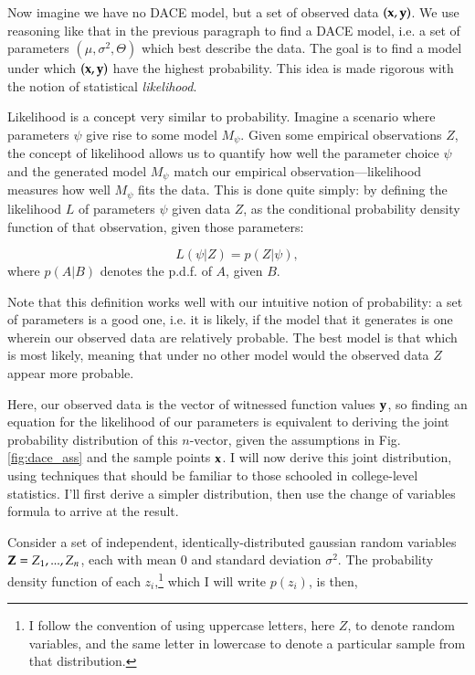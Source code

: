 Now imagine we have no DACE model, but a set of observed data $(\mathbf{x},\mathbf{y})$. We use reasoning like that in the previous paragraph to find a DACE model, i.e. a set of parameters $(\mu,\sigma^2,\Theta)$ which best describe the data. The goal is to find a model under which $(\mathbf{x},\mathbf{y})$ have the highest probability. This idea is made rigorous with the notion of statistical \emph{likelihood}.

Likelihood is a concept very similar to probability. %
Imagine a scenario where parameters $\psi$ give rise to some model $M_\psi$. Given some empirical observations $Z$, the concept of likelihood allows us to quantify how well the parameter choice $\psi$ and the generated model $M_\psi$ match our empirical observation---likelihood measures how well $M_\psi$ fits the data. This is done quite simply: by defining the likelihood $L$ of parameters $\psi$ given data $Z$, as the conditional probability density function of that observation, given those parameters:

\begin{equation} \label{eq:def_likelihood}
L(\psi|Z) = p(Z|\psi),
\end{equation}
where $p(A|B)$ denotes the p.d.f. of $A$, given $B$.

Note that this definition works well with our intuitive notion of probability: a set of parameters is a good one, i.e. it is likely, if the model that it generates is one wherein our observed data are relatively probable. The best model is that which is most likely, meaning that under no other model would the observed data $Z$ appear more probable.

Here, our observed data is the vector of witnessed function values $\mathbf{y}$, so finding an equation for the likelihood of our parameters is equivalent to deriving the joint probability distribution of this $n$-vector, given the assumptions in Fig. \ref{fig:dace_ass} and the sample points $\mathbf{x}$. I will now derive this joint distribution, using techniques that should be familiar to those schooled in college-level statistics. I'll first derive a simpler distribution, then use the change of variables formula to arrive at the result.

Consider a set of independent, identically-distributed gaussian random variables $\mathbf{Z} = Z_1,...,Z_n$, each with mean 0 and standard deviation $\sigma^2$. The probability density function of each $z_i$,\footnote{I follow the convention of using uppercase letters, here $Z$, to denote random variables, and the same letter in lowercase to denote a particular sample from that distribution.} which I will write $p(z_i)$, is then,

